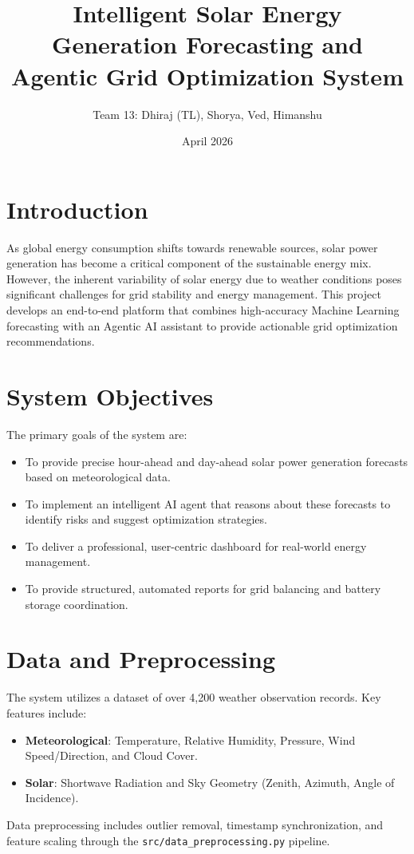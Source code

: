 \documentclass[12pt,a4paper]{article}
\title{\textbf{Intelligent Solar Energy Generation Forecasting and Agentic Grid Optimization System}}
\author{Team 13: Dhiraj (TL), Shorya, Ved, Himanshu}
\date{April 2026}
\begin{document}
\maketitle

\section{Introduction}
As global energy consumption shifts towards renewable sources, solar power generation has become a critical component of the sustainable energy mix. However, the inherent variability of solar energy due to weather conditions poses significant challenges for grid stability and energy management. This project develops an end-to-end platform that combines high-accuracy Machine Learning forecasting with an Agentic AI assistant to provide actionable grid optimization recommendations.

\section{System Objectives}
The primary goals of the system are:
\begin{itemize}
    \item To provide precise hour-ahead and day-ahead solar power generation forecasts based on meteorological data.
    \item To implement an intelligent AI agent that reasons about these forecasts to identify risks and suggest optimization strategies.
    \item To deliver a professional, user-centric dashboard for real-world energy management.
    \item To provide structured, automated reports for grid balancing and battery storage coordination.
\end{itemize}

\section{Data and Preprocessing}
The system utilizes a dataset of over 4,200 weather observation records. Key features include:
\begin{itemize}
    \item \textbf{Meteorological}: Temperature, Relative Humidity, Pressure, Wind Speed/Direction, and Cloud Cover.
    \item \textbf{Solar}: Shortwave Radiation and Sky Geometry (Zenith, Azimuth, Angle of Incidence).
\end{itemize}
Data preprocessing includes outlier removal, timestamp synchronization, and feature scaling through the \texttt{src/data\_preprocessing.py} pipeline.
\end{document}
